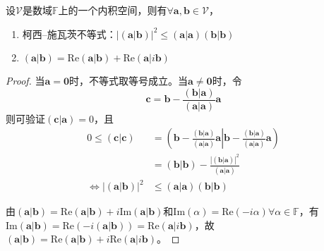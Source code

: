 \documentclass[../main.tex]{subfiles}
\begin{document}
\begin{theorem}\label{thm:II.2.2}
    设$\mathcal{V}$是数域$\mathbb{F}$上的一个内积空间，则有$\forall\mathbf{a},\mathbf{b}\in\mathcal{V}$，
    \begin{enumerate}
        \item 柯西--施瓦茨不等式：$\left|\left(\mathbf{a}|\mathbf{b}\right)\right|^2\leq\left(\mathbf{a}|\mathbf{a}\right)\left(\mathbf{b}|\mathbf{b}\right)$
        \item $\left(\mathbf{a}|\mathbf{b}\right)=\mathrm{Re}\left(\mathbf{a}|\mathbf{b}\right)+\mathrm{Re}\left(\mathbf{a}|i\mathbf{b}\right)$
    \end{enumerate}
\end{theorem}
\begin{proof}
    当$\mathbf{a}=\mathbf{0}$时，不等式取等号成立。当$\mathbf{a}\neq\mathbf{0}$时，令
    \[
        \mathbf{c}=\mathbf{b}-\frac{\left(\mathbf{b}|\mathbf{a}\right)}{\left(\mathbf{a}|\mathbf{a}\right)}\mathbf{a}
    \]
    则可验证$\left(\mathbf{c}|\mathbf{a}\right)=0$，且
    \begin{align*}
        0\leq\left(\mathbf{c}|\mathbf{c}\right)                           & =\left(\mathbf{b}-\frac{\left(\mathbf{b}|\mathbf{a}\right)}{\left(\mathbf{a}|\mathbf{a}\right)}\mathbf{a}\right|\left.\mathbf{b}-\frac{\left(\mathbf{b}|\mathbf{a}\right)}{\left(\mathbf{a}|\mathbf{a}\right)}\mathbf{a}\right) \\
                                                                          & =\left(\mathbf{b}|\mathbf{b}\right)-\frac{\left|\left(\mathbf{b}|\mathbf{a}\right)\right|^2}{\left(\mathbf{a}|\mathbf{a}\right)}                                                                                                \\
        \Leftrightarrow \left|\left(\mathbf{a}|\mathbf{b}\right)\right|^2 & \leq\left(\mathbf{a}|\mathbf{a}\right)\left(\mathbf{b}|\mathbf{b}\right)
    \end{align*}

    由$\left(\mathbf{a}|\mathbf{b}\right)=\mathrm{Re}\left(\mathbf{a}|\mathbf{b}\right)+i\mathrm{Im}\left(\mathbf{a}|\mathbf{b}\right)$和$\mathrm{Im}\left(\alpha\right)=\mathrm{Re}\left(-i\alpha\right)\forall\alpha\in\mathbb{F}$，有$\mathrm{Im}\left(\mathbf{a}|\mathbf{b}\right)=\mathrm{Re}\left(-i\left(\mathbf{a}|\mathbf{b}\right)\right)=\mathrm{Re}\left(\mathbf{a}|i\mathbf{b}\right)$，故$\left(\mathbf{a}|\mathbf{b}\right)=\mathrm{Re}\left(\mathbf{a}|\mathbf{b}\right)+i\mathrm{Re}\left(\mathbf{a}|i\mathbf{b}\right)$。
\end{proof}
\end{document}
